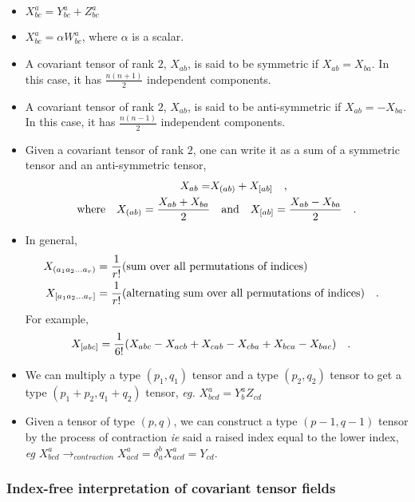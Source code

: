 \documentclass[a4paper,11pt]{article}
\begin{document}
\begin{itemize}
	\item $X^a_{bc} = Y^a_{bc} + Z^a_{bc}$
	\item $ X^a_{bc} = \alpha W^a_{bc} $, where $ \alpha $ is a scalar.
	\item A covariant tensor of rank $ 2 $,  $ X_{ab} $, is said to be symmetric if $ X_{ab} = X_{ba} $. In this case, it has $ \frac{n(n+1)}{2} $ independent components.
	\item A covariant tensor of rank $ 2 $,  $ X_{ab} $, is said to be anti-symmetric if $ X_{ab} = -X_{ba} $. In this case, it has $ \frac{n(n-1)}{2} $ independent components.
	\item Given a covariant tensor of rank $ 2 $, one can write it as a sum of a symmetric tensor and an anti-symmetric tensor,
	\begin{align*}
	X_{ab} = &X_{(ab)} + X_{[ab]} \qq{,} \\
	\qq{where} X_{(ab)} = \dfrac{X_{ab} + X_{ba}}{2} &\qq{and} X_{[ab]} = \dfrac{X_{ab} - X_{ba}}{2} \qq{.}
	\end{align*}
	\item In general,
	\begin{align*}
		X_{(a_1 a_2 \ldots a_r)} &= \dfrac{1}{r!} \text{(sum over all permutations of indices)} \\
		X_{[a_1 a_2 \ldots a_r]} &= \dfrac{1}{r!} \text{(alternating sum over all permutations of indices)} 	\qq{.}	
	\end{align*}
	For example, 
	\begin{equation}\label{key}
	X_{[abc] }  = \dfrac{1}{6!} \qty(X_{abc} -X_{acb} + X_{cab} - X_{cba} + X_{bca} - X_{bac}) \qq{.}
	\end{equation}
	\item We can multiply a type $ (p_1, q_1) $ tensor and a type $ (p_2, q_2) $ tensor to get a type $ (p_1+p_2, q_1+q_2) $ tensor, \textit{eg.} $ X^a_{bcd}  = Y^a_b Z_{cd}$
	
	\item Given a tensor of type $ (p,q) $, we can construct a type $ (p-1, q-1) $ tensor by the process of contraction \textit{ie} said a raised index equal to the lower index, \textit{eg} $ X^{a}_{bcd} \rightarrow_{contraction}  X^{a}_{acd}  = \delta_a^b X^{a}_{acd} = Y_{cd}$.

\end{itemize}

\subsubsection{Index-free interpretation of covariant tensor fields}
\end{document}
